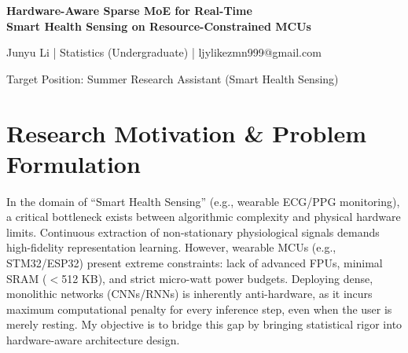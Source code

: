 \documentclass[10pt,a4paper]{article}
\begin{document}
\begin{center}
    {\Large\bfseries Hardware-Aware Sparse MoE for Real-Time\\[2pt]
    Smart Health Sensing on Resource-Constrained MCUs}
    
    \vspace{4pt}
    
    {\small Junyu Li | Statistics (Undergraduate) | ljylikezmn999@gmail.com}
    
    \vspace{2pt}
    
    {\footnotesize Target Position: Summer Research Assistant (Smart Health Sensing)}
\end{center}

\vspace{4pt}

\section{Research Motivation \& Problem Formulation}
\vspace{-2pt}
{\small In the domain of ``Smart Health Sensing'' (e.g., wearable ECG/PPG monitoring), a critical bottleneck exists between algorithmic complexity and physical hardware limits. Continuous extraction of non-stationary physiological signals demands high-fidelity representation learning. However, wearable MCUs (e.g., STM32/ESP32) present extreme constraints: lack of advanced FPUs, minimal SRAM ($<$512 KB), and strict micro-watt power budgets. Deploying dense, monolithic networks (CNNs/RNNs) is inherently anti-hardware, as it incurs maximum computational penalty for every inference step, even when the user is merely resting. My objective is to bridge this gap by bringing statistical rigor into hardware-aware architecture design.}

\end{document}
